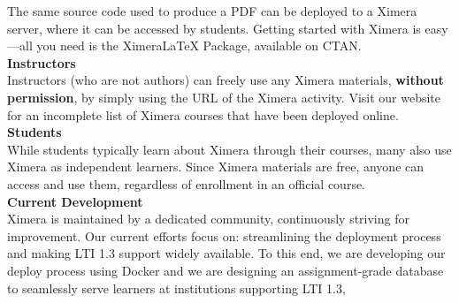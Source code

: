 \documentclass{article}
\begin{document}
\begin{multicols}{2}
\begin{center}
\begin{tikzpicture}
        \end{tikzpicture}
    \end{center}
    The same source code used to produce a PDF can be deployed to a Ximera
    server, where it can be accessed by students. Getting started with Ximera
    is
    easy---all you need is the XimeraLaTeX Package, available on CTAN.
    \\[.5cm]
    {\sffamily\bfseries Instructors}\\
    Instructors (who are not authors) can freely use any Ximera materials,
    \textbf{without permission}, by simply using the URL of the Ximera
    activity. Visit our website for an incomplete list of Ximera courses that
    have
    been deployed online.
    \\[.5cm]%
    {\sffamily\bfseries Students}\\
    While students typically learn about Ximera through their courses, many
    also use Ximera as independent learners. Since Ximera materials are free,
    anyone can access and use them, regardless of enrollment in an official course.
    \\[.5cm]
    {\sffamily\bfseries Current Development}\\
    Ximera is maintained by a dedicated community, continuously striving for
    improvement. Our current efforts focus on: streamlining the deployment
    process and   making LTI 1.3 support widely available. To this end, we are
    developing our
    deploy process using Docker and we are designing an assignment-grade database
    to
    seamlessly serve  learners at institutions supporting LTI 1.3,
    \begin{center}
\end{center}
\end{multicols}
\end{document}
